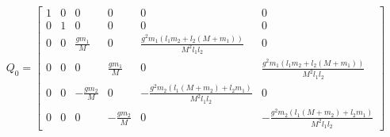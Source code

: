 \documentclass[preview]{standalone}
\begin{document}
\begin{align*}
Q_0 = \left[\begin{matrix}1 & 0 & 0 & 0 & 0 & 0\\0 & 1 & 0 & 0 & 0 & 0\\0 & 0 & \frac{g m_{1}}{M} & 0 & \frac{g^{2} m_{1} \left(l_{1} m_{2} + l_{2} \left(M + m_{1}\right)\right)}{M^{2} l_{1} l_{2}} & 0\\0 & 0 & 0 & \frac{g m_{1}}{M} & 0 & \frac{g^{2} m_{1} \left(l_{1} m_{2} + l_{2} \left(M + m_{1}\right)\right)}{M^{2} l_{1} l_{2}}\\0 & 0 & - \frac{g m_{2}}{M} & 0 & - \frac{g^{2} m_{2} \left(l_{1} \left(M + m_{2}\right) + l_{2} m_{1}\right)}{M^{2} l_{1} l_{2}} & 0\\0 & 0 & 0 & - \frac{g m_{2}}{M} & 0 & - \frac{g^{2} m_{2} \left(l_{1} \left(M + m_{2}\right) + l_{2} m_{1}\right)}{M^{2} l_{1} l_{2}}\end{matrix}\right]
\end{align*}
\end{document}
